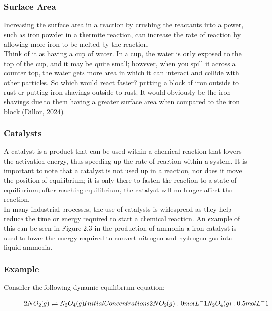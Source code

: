 \subsubsection{Surface Area}
Increasing the surface area in a reaction by crushing the reactants into a power, such as iron powder in a thermite reaction, can increase the rate of reaction by allowing more iron to be melted by the reaction. \\
Think of it as having a cup of water. In a cup, the water is only exposed to the top of the cup, and it may be quite small; however, when you spill it across a counter top, the water gets more area in which it can interact and collide with other particles. So which would react faster? putting a block of iron outside to rust or putting iron shavings outside to rust. It would obviously be the iron shavings due to them having a greater surface area when compared to the iron block (Dillon, 2024).



\subsubsection{Catalysts}

A catalyst is a product that can be used within a chemical reaction that lowers the activation energy, thus speeding up the rate of reaction within a system. It is important to note that a catalyst is not used up in a reaction, nor does it move the position of equilibrium; it is only there to fasten the reaction to a state of equilibrium; after reaching equilibrium, the catalyst will no longer affect the reaction. \\

In many industrial processes, the use of catalysts is widespread as they help reduce the time or energy required to start a chemical reaction. 
An example of this can be seen in Figure 2.3 in the production of ammonia a iron catalyst is used to lower the energy required to convert nitrogen and hydrogen gas into liquid ammonia.

\newpage

\subsubsection{Example}
Consider the following dynamic equilibrium equation: 

\begin{figure}[htp]
    \centering
    \[
        2NO_{2}(g) \rightleftharpoons N_{2}O_{4}(g) \\

	Initial Concentrations \\
	2NO_{2}(g) : 0 mol L^-1	\\ N_{2}O_{4}(g) : 0.5 mol L^-1
    \]
    \caption{}
    \label{fig:enter-label}
\end{figure}

